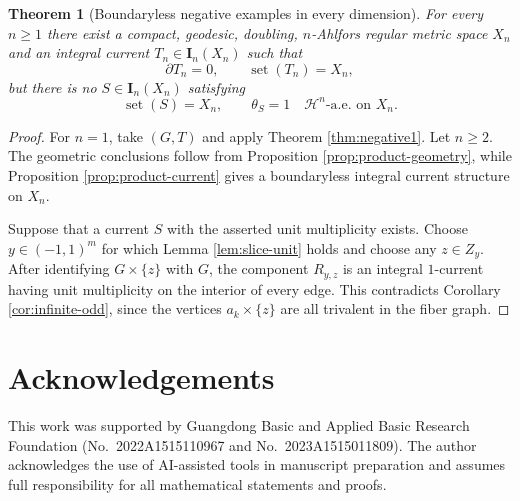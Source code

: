 \documentclass[11pt]{article}
\newtheorem{theorem}{Theorem}[section]
\theoremstyle{remark}
\newcommand{\I}{\mathbf I}
\newcommand{\Hh}{\mathcal H}
\newcommand{\set}{\operatorname{set}}
\begin{document}
\begin{theorem}[Boundaryless negative examples in every dimension]\label{thm:negative-n}
For every $n\ge1$ there exist a compact, geodesic, doubling, $n$-Ahlfors regular metric space $X_n$ and an integral current $T_n\in\I_n(X_n)$ such that
\[
       \partial T_n=0,
       \qquad
       \set(T_n)=X_n,
\]
but there is no $S\in\I_n(X_n)$ satisfying
\[
       \set(S)=X_n,
       \qquad
       \theta_S=1\quad\Hh^n\text{-a.e. on }X_n.
\]
\end{theorem}

\begin{proof}
For $n=1$, take $(G,T)$ and apply Theorem \ref{thm:negative1}. Let $n\ge2$. The geometric conclusions follow from Proposition \ref{prop:product-geometry}, while Proposition \ref{prop:product-current} gives a boundaryless integral current structure on $X_n$.

Suppose that a current $S$ with the asserted unit multiplicity exists. Choose $y\in(-1,1)^m$ for which Lemma \ref{lem:slice-unit} holds and choose any $z\in Z_y$. After identifying $G\times\{z\}$ with $G$, the component $R_{y,z}$ is an integral $1$-current having unit multiplicity on the interior of every edge. This contradicts Corollary \ref{cor:infinite-odd}, since the vertices $a_k\times\{z\}$ are all trivalent in the fiber graph.
\end{proof}

\section*{Acknowledgements}
This work was supported by Guangdong Basic and Applied Basic Research Foundation
(No.~2022A1515110967 and No.~2023A1515011809). The author acknowledges the use of AI-assisted tools in manuscript preparation and assumes full responsibility for all mathematical statements and proofs.
\end{document}
